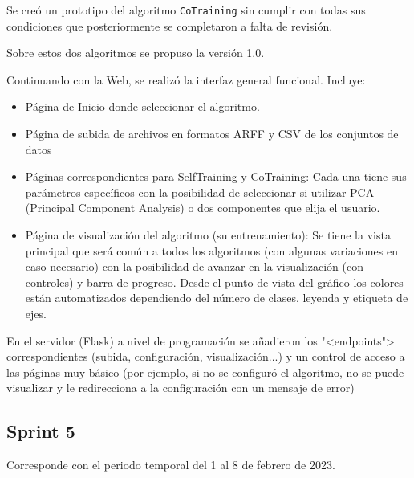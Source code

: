 Se creó un prototipo del algoritmo \texttt{CoTraining} sin cumplir con todas sus
condiciones que posteriormente se completaron a falta de revisión. 

Sobre estos dos algoritmos se propuso la versión 1.0. 

Continuando con la Web, se realizó la interfaz general funcional. Incluye:
\begin{itemize}
    \item Página de Inicio donde seleccionar el algoritmo.
    \item Página de subida de archivos en formatos ARFF y CSV de los conjuntos de datos
    \item Páginas correspondientes para SelfTraining y CoTraining: Cada una
    tiene sus parámetros específicos con la posibilidad de seleccionar si
    utilizar PCA (Principal Component Analysis) o dos componentes que elija el usuario.
    \item Página de visualización del algoritmo (su entrenamiento): Se tiene la
    vista principal que será común a todos los algoritmos (con algunas
    variaciones en caso necesario) con la posibilidad de avanzar en la
    visualización (con controles) y barra de progreso. Desde el punto de vista
    del gráfico los colores están automatizados dependiendo del número de
    clases, leyenda y etiqueta de ejes. 
\end{itemize}
En el servidor (Flask) a nivel de programación se añadieron los "<endpoints">
correspondientes (subida, configuración, visualización...) y un control de
acceso a las páginas muy básico (por ejemplo, si no se configuró el algoritmo,
no se puede visualizar y le redirecciona a la configuración con un mensaje de error)

\subsection{Sprint 5}
Corresponde con el periodo temporal del 1 al 8 de febrero de 2023.

